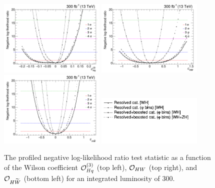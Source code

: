 \documentclass[a4paper,11pt]{article}
\begin{document}
\begin{figure}[t]
\begin{center}
\includegraphics[width=0.45\textwidth]{Figures/New/RECO/Limits/Full_NLL_WC_cpq3i_2019_opt1.png}
\includegraphics[width=0.45\textwidth]{Figures/New/RECO/Limits/Full_NLL_WC_cpW_2019_opt2.png}
\includegraphics[width=0.45\textwidth]{Figures/New/RECO/Limits/Full_NLL_WC_cpWtilde_2019_opt2.png}
\includegraphics[width=0.45\textwidth]{Figures/New/RECO/Selection_285.png}
\end{center}
\caption{
The profiled negative log-likelihood ratio test statistic %
as a function of the Wilson coefficient ${\cal O}^{(3)}_{Hq}$ (top left), ${\cal O}_{HW}$ (top right), and ${\cal O}_{H\widetilde{W}}$ (bottom left) for an integrated luminosity of 300\fbinv.
}
\label{fig:NLL}
\end{figure}
\end{document}
